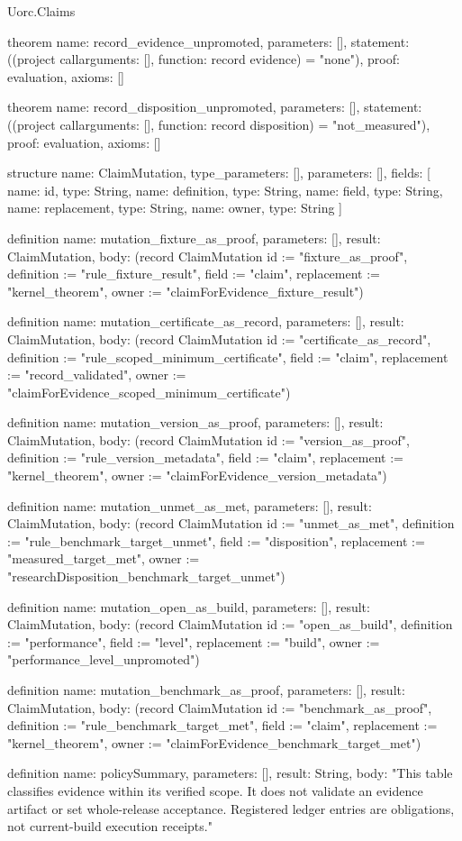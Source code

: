 \begin{lexlean}{Uorc.Claims}
\begin{semanticmodule}
theorem{
  name: record_evidence_unpromoted,
  parameters: [],
  statement: ((project call{arguments: [], function: record} evidence) = "none"),
  proof: evaluation{},
  axioms: []
}

theorem{
  name: record_disposition_unpromoted,
  parameters: [],
  statement: ((project call{arguments: [], function: record} disposition) = "not_measured"),
  proof: evaluation{},
  axioms: []
}

structure{
  name: ClaimMutation,
  type_parameters: [],
  parameters: [],
  fields: [
    {name: id, type: String},
    {name: definition, type: String},
    {name: field, type: String},
    {name: replacement, type: String},
    {name: owner, type: String}
  ]
}

definition{
  name: mutation_fixture_as_proof,
  parameters: [],
  result: ClaimMutation,
  body: (record ClaimMutation {id := "fixture_as_proof", definition := "rule_fixture_result", field := "claim", replacement := "kernel_theorem", owner := "claimForEvidence_fixture_result"})
}

definition{
  name: mutation_certificate_as_record,
  parameters: [],
  result: ClaimMutation,
  body: (record ClaimMutation {id := "certificate_as_record", definition := "rule_scoped_minimum_certificate", field := "claim", replacement := "record_validated", owner := "claimForEvidence_scoped_minimum_certificate"})
}

definition{
  name: mutation_version_as_proof,
  parameters: [],
  result: ClaimMutation,
  body: (record ClaimMutation {id := "version_as_proof", definition := "rule_version_metadata", field := "claim", replacement := "kernel_theorem", owner := "claimForEvidence_version_metadata"})
}

definition{
  name: mutation_unmet_as_met,
  parameters: [],
  result: ClaimMutation,
  body: (record ClaimMutation {id := "unmet_as_met", definition := "rule_benchmark_target_unmet", field := "disposition", replacement := "measured_target_met", owner := "researchDisposition_benchmark_target_unmet"})
}

definition{
  name: mutation_open_as_build,
  parameters: [],
  result: ClaimMutation,
  body: (record ClaimMutation {id := "open_as_build", definition := "performance", field := "level", replacement := "build", owner := "performance_level_unpromoted"})
}

definition{
  name: mutation_benchmark_as_proof,
  parameters: [],
  result: ClaimMutation,
  body: (record ClaimMutation {id := "benchmark_as_proof", definition := "rule_benchmark_target_met", field := "claim", replacement := "kernel_theorem", owner := "claimForEvidence_benchmark_target_met"})
}

definition{
  name: policySummary,
  parameters: [],
  result: String,
  body: "This table classifies evidence within its verified scope. It does not validate an evidence artifact or set whole-release acceptance. Registered ledger entries are obligations, not current-build execution receipts."
}
\end{semanticmodule}
\end{lexlean}
